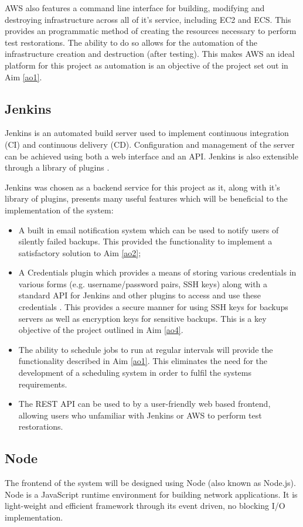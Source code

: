 \label{aws-cli} AWS also features a command line interface for building, modifying and destroying infrastructure across all of it's service, including EC2 and ECS. This provides an programmatic method of creating the resources necessary to perform test restorations. The ability to do so allows for the automation of the infrastructure creation and destruction (after testing). This makes AWS an ideal platform for this project as automation is an objective of the project set out in Aim \ref{ao1}. 


\subsection{Jenkins}
Jenkins is an automated build server used to implement continuous integration (CI) and continuous delivery (CD). Configuration and management of the server can be achieved using both a web interface and an API. Jenkins is also extensible through a library of plugins \citep{jenkins}.
 
Jenkins was chosen as a backend service for this project as it, along with it's library of plugins, presents many useful features which will be beneficial to the implementation of the system:
\begin{itemize}
	\item A built in email notification system which can be used to notify users of silently failed backups. This provided the functionality to implement a satisfactory solution to Aim \ref{ao2};
	\item \label{creds-plugin}A Credentials plugin which provides a means of storing various credentials in various forms (e.g. username/password pairs, SSH keys) along with a standard API for Jenkins and other plugins to access and use these credentials \citep{connolly}. This provides a secure manner for using SSH keys for backups servers as well as encryption keys for sensitive backups. This is a key objective of the project outlined in Aim \ref{ao4}.
	\item The ability to schedule jobs to run at regular intervals will provide the functionality described in Aim \ref{ao1}. This eliminates the need for the development of a scheduling system in order to fulfil the systems requirements. 
	\item The REST API can be used to by a user-friendly web based frontend, allowing users who unfamiliar with Jenkins or AWS to perform test restorations. 
\end{itemize}


\subsection{Node}
The frontend of the system will be designed using Node (also known as Node.js). Node is a JavaScript runtime environment for building network applications. It is light-weight and efficient framework through its event driven, no blocking I/O implementation. 

